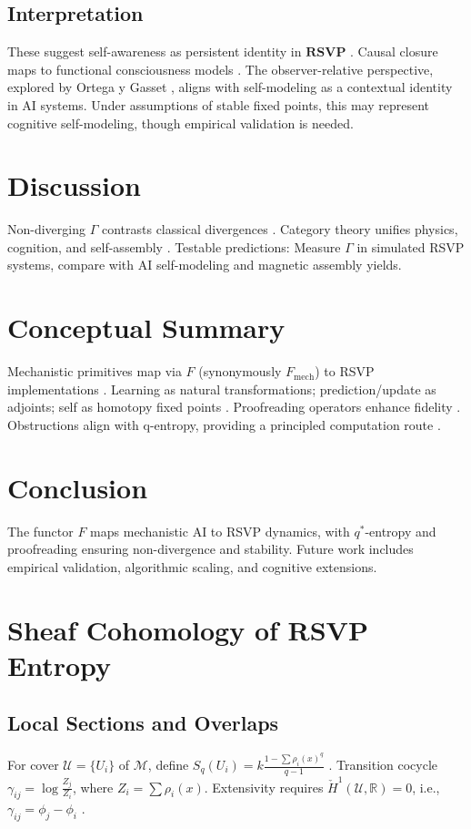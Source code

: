 \documentclass{article}
\theoremstyle{plain}
\theoremstyle{definition}
\begin{document}
\subsection{Interpretation}
These suggest self-awareness as persistent identity in $\mathbf{RSVP}$ \cite{Bennett2025}. Causal closure maps to functional consciousness models \cite{Pearl2009,Goguen1992}. The observer-relative perspective, explored by Ortega y Gasset \cite{Ortega1931}, aligns with self-modeling as a contextual identity in AI systems. Under assumptions of stable fixed points, this may represent cognitive self-modeling, though empirical validation is needed.

\section{Discussion}

Non-diverging $\Gamma$ contrasts classical divergences \cite{Soares2023prb}. Category theory unifies physics, cognition, and self-assembly \cite{Spivak2014,Goguen1992,Liang2025}. Testable predictions: Measure $\Gamma$ in simulated RSVP systems, compare with AI self-modeling and magnetic assembly yields.

\section{Conceptual Summary}
Mechanistic primitives map via $F$ (synonymously $F_\text{mech}$) to RSVP implementations \cite{Bennett2025,Spivak2014}. Learning as natural transformations; prediction/update as adjoints; self as homotopy fixed points \cite{Awodey2010}. Proofreading operators enhance fidelity \cite{Liang2025}. Obstructions align with q-entropy, providing a principled computation route \cite{Soares2024,Tsallis1988}.

\section{Conclusion}
The functor $F$ maps mechanistic AI to RSVP dynamics, with $q^*$-entropy and proofreading ensuring non-divergence and stability. Future work includes empirical validation, algorithmic scaling, and cognitive extensions.

\appendix

\section{Sheaf Cohomology of RSVP Entropy}
\FloatBarrier
\subsection{Local Sections and Overlaps}
For cover $\mathcal{U} = \{U_i\}$ of $\mathcal{M}$, define $S_q(U_i) = k \frac{1 - \sum \rho_i(x)^q}{q-1}$ \cite{Tsallis1988}. Transition cocycle $\gamma_{ij} = \log \frac{Z_j}{Z_i}$, where $Z_i = \sum \rho_i(x)$. Extensivity requires $\check{H}^1(\mathcal{U}, \mathbb{R}) = 0$, i.e., $\gamma_{ij} = \phi_j - \phi_i$ \cite{MacLane1992,Soares2024}.
\end{document}
